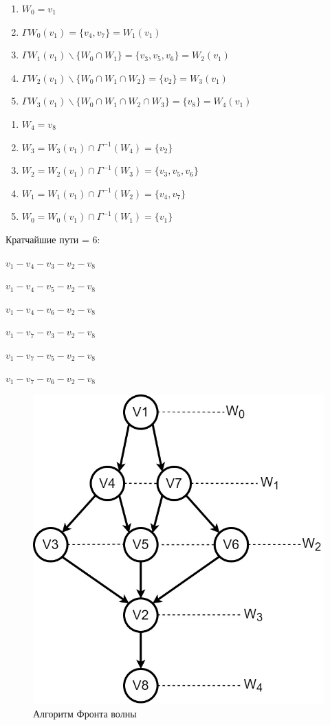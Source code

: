 \begin{enumerate}
    \item[]$W_0 = v_1$
    \item[]$\Gamma W_0(v_1) = \{v_4, v_7 \} =
W_1(v_1)
$
    \item[]$\Gamma W_1(v_1)\backslash\{W_0 \cap W_1\} = \{v_3, v_5, v_6 \} =
W_2(v_1)
$
\item[]$\Gamma W_2(v_1)\backslash\{W_0 \cap W_1 \cap W_2\} = \{v_2\} =
W_3(v_1)
$
\item[]$\Gamma W_3(v_1)\backslash\{W_0 \cap W_1 \cap W_2 \cap W_3\} = \{v_8\} =
W_4(v_1)
$
\end{enumerate}
\begin{enumerate}
    \item[] $W_4 = v_8$
    \item[] $W_3 = W_3(v_1) \cap \Gamma^{-1}(W_4) = \{ v_2 \}$
    \item[] $W_2 = W_2(v_1) \cap \Gamma^{-1}(W_3) = \{ v_3, v_5, v_6 \}$
    \item[] $W_1 = W_1(v_1) \cap \Gamma^{-1}(W_2) = \{ v_4, v_7\}$
    \item[] $W_0 = W_0(v_1) \cap \Gamma^{-1}(W_1) = \{ v_1\}$
\end{enumerate}
\newpage
Кратчайшие пути = 6:

$v_1 - v_4 - v_3 - v_2 - v_8$

$v_1 - v_4 - v_5 - v_2 - v_8$

$v_1 - v_4 - v_6 - v_2 - v_8$

$v_1 - v_7 - v_3 - v_2 - v_8$

$v_1 - v_7 - v_5 - v_2 - v_8$

$v_1 - v_7 - v_6 - v_2 - v_8$
\begin{figure}[!htb]
	\centering
	\includegraphics[width=\textwidth]{Images/graph2.jpg}
	\caption{Алгоритм Фронта волны}
	\label{fig:image2}
\end{figure}
\newpage
